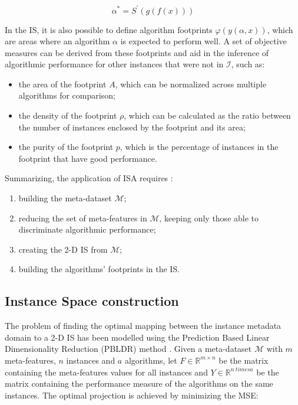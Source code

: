 \begin{equation}
	\alpha^* = S^\prime(g(f(x)))
\end{equation}

In the IS, it is also possible to define algorithm footprints $\varphi(y(\alpha, x))$, which are areas where an algorithm $\alpha$ is expected to perform well. A set of objective measures can be derived from these footprints and aid in the inference of algorithmic performance for other instances that were not in $\mathcal{I}$, such as: 

\begin{itemize}
	\item the area of the footprint $A$, which can be normalized across multiple algorithms for comparison;
	\item the density of the footprint $\rho$, which can be calculated as the ratio between the number of instances enclosed by the footprint and its area;
	\item the purity of the footprint $p$, which is the percentage of instances in the footprint that have good performance.
\end{itemize}

Summarizing, the application of ISA requires \cite{Munoz2018}:

\begin{enumerate}
	\item building the meta-dataset $\mathcal{M}$;
	\item reducing the set of meta-features in $\mathcal{M}$, keeping only those able to discriminate algorithmic performance;
	\item creating the 2-D IS from $\mathcal{M}$;
	\item building the algorithms' footprints in the IS.
\end{enumerate}

\subsection{Instance Space construction}

The problem of finding the optimal mapping between the instance metadata domain to a 2-D IS has been modelled using the Prediction Based Linear Dimensionality Reduction (PBLDR) method \cite{Munoz2018}. Given a meta-dataset $\mathcal{M}$ with $m$ meta-features, $n$ instances and $a$ algorithms, let $F \in \mathbb{R}^{m \times n}$ be the matrix containing the meta-features values for all instances and $Y \in \mathbb{R}^{n \ times a}$ be the matrix containing the performance measure of the algorithms on the same instances. The optimal projection is achieved by minimizing the MSE:

